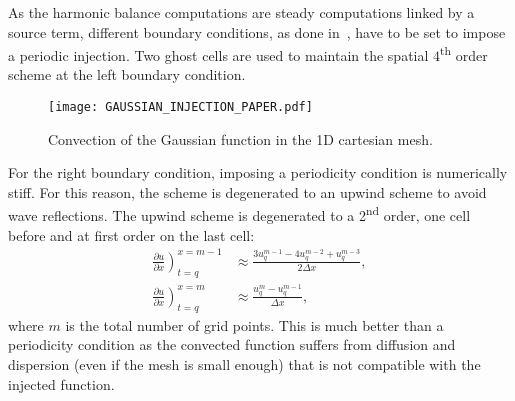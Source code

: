 As the harmonic balance computations are steady computations linked 
by a source term, 
different boundary conditions, as done in~\cite{Dufour2010},
have to be set to impose a periodic injection. Two ghost cells
are used to maintain the spatial $4$\textsuperscript{th} order scheme 
at the left
boundary condition.
\begin{figure}[htbp]
  \begin{center}
    \texttt{[image: GAUSSIAN\_INJECTION\_PAPER.pdf]}
  \end{center}
  \caption{Convection of the Gaussian function in the 1D cartesian mesh.}
  \label{fig:convection_injection_paper}
\end{figure}
For the right boundary condition, imposing a periodicity condition is
numerically stiff. For this reason, the scheme is degenerated 
to an upwind scheme to avoid wave reflections. The upwind scheme is degenerated to
a 2\textsuperscript{nd} order, one cell before and at first order on the 
last cell:
\begin{align}
    \left. \frac{\partial u}{\partial x} \right)_{t=q}^{x=m-1} &\approx 
    \frac{3 u^{m-1}_{q} - 4 u^{m-2}_{q} + u^{m-3}_{q}}{2\Delta x}, \\
    \left. \frac{\partial u}{\partial x} \right)_{t=q}^{x=m} &\approx 
    \frac{u^{m}_{q} - u^{m-1}_{q}}{\Delta x},
\label{eq:upwind_scheme}
\end{align}
where $m$ is the total number of grid points. This is much better than a periodicity
condition as the convected function suffers from diffusion and dispersion (even if the
mesh is small enough) that is not compatible with the injected function.

